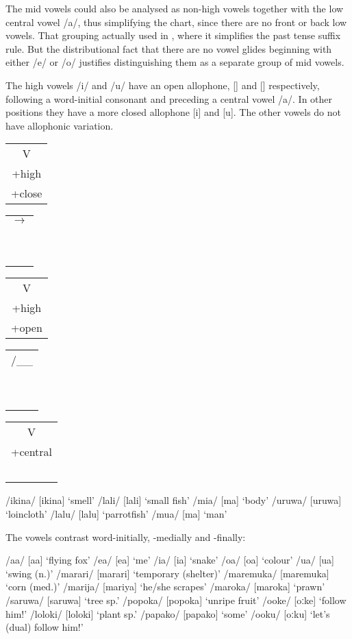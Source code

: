 The mid vowels could also be analysed as non-high vowels together with the low central vowel /a/, thus simplifying the chart, since there are no front or back low vowels. That grouping  actually used in , where it simplifies the past tense suffix rule. But the distributional fact that there are no vowel glides beginning with either /e/ or /o/ justifies distinguishing them as a separate group of mid vowels.  

The high vowels /i/ and /u/ have an open allophone, [{\textsci}] and [{\textupsilon}] respectively, following a word-initial consonant and preceding a central vowel /a/. In other positions they have a more closed allophone [i] and [u]. The other vowels do not have allophonic variation.

\ea
\begin{tabular}{c}V\\+high\\+close\end{tabular}
\begin{tabular}{c}$\to$\\~\\~\end{tabular}
\begin{tabular}{c}V\\+high\\+open\end{tabular}
\begin{tabular}{c}/\_\_\\~\\~\end{tabular}
\begin{tabular}{c}V\\+central\\~\end{tabular}
\z

\ea
\ea
/ikina/  [i{{\textprimstress}kina}]  `smell'
\ex
/lali/  [la{{\textprimstress}li}]  `small fish'
\ex
/mia/  [m{\textsci{{\textprimstress}}}a]  `body'
\ex
/uruwa/  [u{{\textprimstress}ruwa}]  `loincloth'
\ex
/lalu/  [la{{\textprimstress}lu}]  `parrotfish'
\ex
/mua/  [m{\textupsilon{{\textprimstress}}}a]  `man'
\z
\z

The vowels contrast word-initially, -medially and -finally:

\ea
\ea
/a{\textphi}a/  [a{{\textprimstress}}{\textphi}a]  `flying fox'
\ex
/e{\textphi}a/  [e{{\textprimstress}}{\textphi}a]  `me'
\ex
/i{\textphi}a/  [i{{\textprimstress}}{\textphi}a]  `snake'
\ex
/o{\textphi}a/  [o{{\textprimstress}}{\textphi}a]  `colour'
\ex
/u{\textphi}a/  [u{{\textprimstress}}{\textphi}a]  `swing (n.)'
\ex
/marari/  [ma{{\textprimstress}rari}]  `temporary (shelter)'
\ex
/maremuka/  [ma{{\textprimstress}remuka}]  `corn (med.)'
\ex
/marija/  [ma{{\textprimstress}riya}]  `he/she scrapes'
\ex
/maroka/  [ma{{\textprimstress}roka}]  `prawn'
\ex
/saruwa/  [sa{{\textprimstress}ruwa}]  `tree sp.'
\ex
/popoka/  [po{{\textprimstress}poka}]  `unripe fruit'
\ex
/ooke/  [{{\textprimstress}oːke}]  `follow him!'
\ex
/loloki/  [lo{{\textprimstress}loki}]  `plant sp.'
\ex
/papako/  [pa{{\textprimstress}pako}]  `some'
\ex
/ooku/  [{{\textprimstress}oːku}]  `let's (dual) follow him!'
\z
\z

